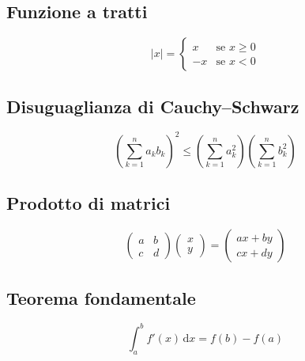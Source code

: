 \documentclass[a4paper,11pt]{article}
\begin{document}
\subsection*{Funzione a tratti}
\[
|x| =
\begin{cases}
  x  & \text{se } x \geq 0 \\
  -x & \text{se } x < 0
\end{cases}
\]

\subsection*{Disuguaglianza di Cauchy--Schwarz}
\[
\left( \sum_{k=1}^{n} a_k b_k \right)^{2} \leq \left( \sum_{k=1}^{n} a_k^2 \right) \left( \sum_{k=1}^{n} b_k^2 \right)
\]

\subsection*{Prodotto di matrici}
\[
\begin{pmatrix} a & b \\ c & d \end{pmatrix}
\begin{pmatrix} x \\ y \end{pmatrix}
=
\begin{pmatrix} ax + by \\ cx + dy \end{pmatrix}
\]

\subsection*{Teorema fondamentale}
\[
\int_{a}^{b} f'(x)\,\mathrm{d}x = f(b) - f(a)
\]
\end{document}
